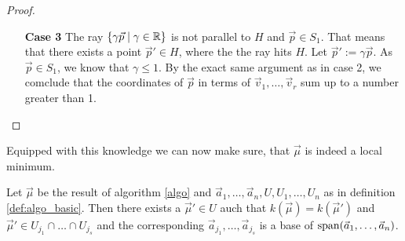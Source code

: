 \begin{proof}
\begin{itemize}
        \item[\textbf{Case 3}] The ray $\{\gamma\vec p\mid \gamma \in \mathbb{R}\}$ is not parallel to $H$ and $\vec p \in S_1$. That means that there exists a point $\vec p' \in H$, where the the ray hits $H$. Let $\vec p' := \gamma \vec p$. As $\vec p \in S_1$, we know that $\gamma \leq 1$. By the exact same argument as in case 2, we comclude that the coordinates of $\vec p$ in terms of $\vec v_1, \dots, \vec v_r$ sum up to a number greater than 1.
    \end{itemize}
\end{proof}

Equipped with this knowledge we can now make sure, that $\vec\mu$ is indeed a local minimum.
\begin{lemma}
    \label{lemma:sub_fecets_are_extendable}
    Let $\vec\mu$ be the result of algorithm \ref{algo} and $\vec a_1, \dots, \vec a_n, U, U_1, \dots, U_n$ as in definition \ref{def:algo_basic}. Then there exists a $\vec\mu' \in U$ auch that $k(\vec\mu) = k(\vec\mu')$ and $\vec\mu' \in U_{j_1} \cap \dots \cap U_{j_{s}}$ and the corresponding $\vec a_{j_1}, \dots, \vec a_{j_s}$ is a base of $\operatorname{span}(\vec a_1, \dots, \vec a_n)$.
\end{lemma}
